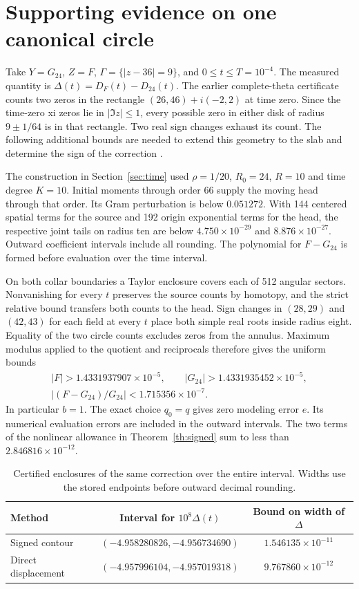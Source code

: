 \section{Supporting evidence on one canonical circle}\label{sec:evidence}
Take \(Y=G_{24}\), \(Z=F\), \(\Gamma=\{|z-36|=9\}\), and \(0\le t\le T=10^{-4}\). The measured quantity is
\(\Delta(t)=D_F(t)-D_{24}(t)\). The earlier complete-theta certificate \cite{hdc} counts two zeros in the rectangle \((26,46)+i(-2,2)\) at time zero. Since the time-zero xi zeros lie in \(|\Im z|\le1\), every possible zero in either disk of radius \(9\pm1/64\) is in that rectangle. Two real sign changes exhaust its count. The following additional bounds are needed to extend this geometry to the slab and determine the sign of the correction \cite{jh07,jh08}.

The construction in Section~\ref{sec:time} used \(\rho=1/20\), \(R_0=24\), \(R=10\) and time degree \(K=10\). Initial moments through order 66 supply the moving head through that order. Its Gram perturbation is below \(0.051272\). With 144 centered spatial terms for the source and 192 origin exponential terms for the head, the respective joint tails on radius ten are below \(4.750\times10^{-29}\) and \(8.876\times10^{-27}\). Outward coefficient intervals include all rounding. The polynomial for \(F-G_{24}\) is formed before evaluation over the time interval.

On both collar boundaries a Taylor enclosure covers each of 512 angular sectors. Nonvanishing for every \(t\) preserves the source counts by homotopy, and the strict relative bound transfers both counts to the head. Sign changes in \((28,29)\) and \((42,43)\) for each field at every \(t\) place both simple real roots inside radius eight. Equality of the two circle counts excludes zeros from the annulus. Maximum modulus applied to the quotient and reciprocals therefore gives the uniform bounds
\[
\begin{gathered}
  |F|>1.4331937907\times10^{-5},\qquad
  |G_{24}|>1.4331935452\times10^{-5},\\
  |(F-G_{24})/G_{24}|<1.715356\times10^{-7}.
\end{gathered}
\]
In particular \(b=1\). The exact choice \(q_0=q\) gives zero modeling error \(e\). Its numerical evaluation errors are included in the outward intervals. The two terms of the nonlinear allowance in Theorem~\ref{th:signed} sum to less than \(2.846816\times10^{-12}\).

\begin{table}[htb]
\centering\small
\caption{Certified enclosures of the same correction over the entire interval. Widths use the stored endpoints before outward decimal rounding.}\label{tab:certificate}
\begin{tabular}{@{}lcc@{}}
\toprule
Method & Interval for \(10^8\Delta(t)\) & Bound on width of \(\Delta\)\\
\midrule
Signed contour & \((-4.958280826,-4.956734690)\) & \(1.546135\times10^{-11}\)\\
Direct displacement & \((-4.957996104,-4.957019318)\) & \(9.767860\times10^{-12}\)\\
\bottomrule
\end{tabular}
\end{table}

